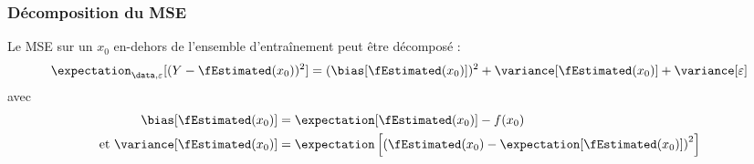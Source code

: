     \subsubsection{Décomposition du MSE}
        \begin{theorem}
            Le MSE sur un \(x_0\) en-dehors de l'ensemble d'entraînement peut être décomposé :
            \[
                \expectation_{\data, \varepsilon}[(Y - \fEstimated(x_0))^2] = (\bias[\fEstimated(x_0)])^2 + \variance[\fEstimated(x_0)] + \variance[\varepsilon]
            \] avec
            \begin{align*}
                \bias[\fEstimated(x_0)] &= \expectation[\fEstimated(x_0)] - f(x_0)\\
                \text{et } \variance[\fEstimated(x_0)] &= \expectation\left[\left(\fEstimated(x_0) - \expectation[\fEstimated(x_0)]\right)^2\right]
            \end{align*}
        \end{theorem}
